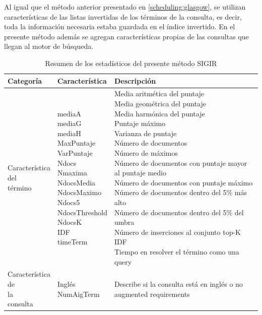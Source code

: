 Al igual que el método anterior presentado en \ref{scheduling:glasgow}, se utilizan características de las listas invertidas de los términos de la consulta, es decir, toda la información necesaria estaba guardada en el índice invertido. En el presente método además se agregan características propias de las consultas que llegan al motor de búsqueda. 



\begin{table}[!th]
\centering
\caption{Resumen de los estadísticos del presente método SIGIR}
\label{tabla:estadisticosSigir}

\begin{tabular}{| l | l | l |}
  \hline
  \textbf{Categoría} & \textbf{Característica} & \textbf{Descripción}  \\
  \hline
  \pbox{3cm}{ Característica \\ del \\ término} & 
  \pbox{30cm}{ mediaA \\ mediaG \\ mediaH \\ MaxPuntaje \\ VarPuntaje \\ Ndocs \\ Nmaxima \\ NdocsMedia \\ NdocsMaximo \\ Ndocs5 \\ NdocsThreshold \\ NdocsK \\ IDF \\ timeTerm} & 
  \pbox{20cm}{ Media aritmética del puntaje \\ Media geométrica del puntaje \\ Media harmónica del puntaje \\ Puntaje máximo \\ Varianza de puntaje \\ Número de documentos \\ Número de máximos \\ Número de documentos con puntaje mayor al puntaje medio \\ Número de documentos con puntaje máximo \\ Número de documentos dentro del 5\% más alto \\ Número de documentos dentro del 5\% del umbra \\ Número de inserciones al conjunto top-K \\ IDF \\ Tiempo en resolver el término como una query }  \\ 
  \hline  
  \pbox{3cm}{ Característica \\ de \\ la \\ consulta} & 
  \pbox{30cm}{ Inglés \\ NumAigTerm} & 
  \pbox{20cm}{ Describe si la consulta está en inglés o no \\ augmented requirements}  \\  
  \hline
  


\end{tabular}
\end{table}
